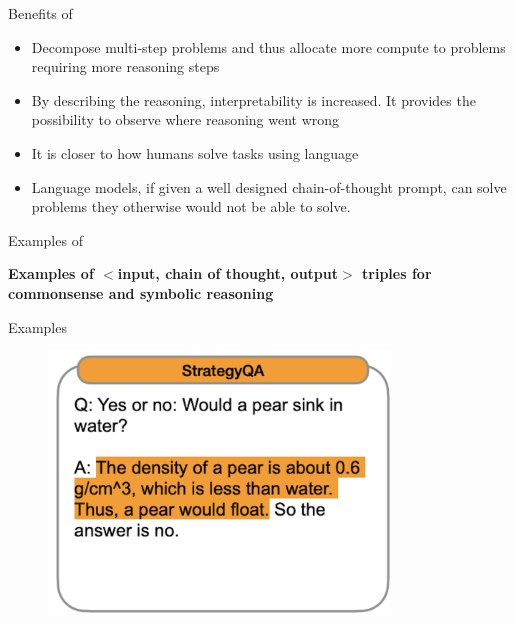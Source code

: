 

\begin{vbframe}{Benefits of \cotpfull}

\vfill

\begin{itemize}
    \item Decompose multi-step problems and thus allocate more compute to problems requiring more reasoning steps
    \item By describing the reasoning, interpretability is increased. It provides the possibility to observe where reasoning went wrong
    \item It is closer to how humans solve tasks using language
    \item Language models, if
given a well designed chain-of-thought prompt, can
    solve problems they otherwise would not be able to solve.
\end{itemize}

\vfill

\end{vbframe}



\begin{vbframe}{Examples of \cotpfull}

\vfill

\textbf{Examples of $<$input, chain of thought, output$>$ triples for  commonsense and symbolic reasoning}



\vfill

\end{vbframe}


\begin{vbframe}{Examples}

\vfill

\begin{figure}
    \centering
    \includegraphics[height=7cm]{figure/cotex1.png}
\end{figure}

\vfill

\end{vbframe}

